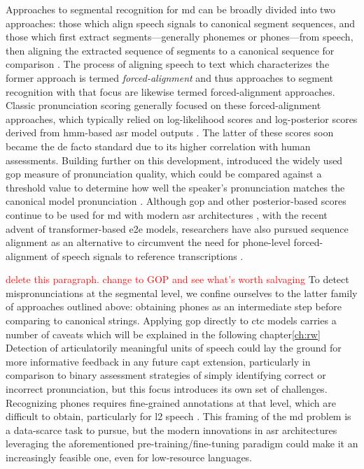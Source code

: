 \documentclass[thesis]{cluu}
\newcommand{\todo}[1]{\textcolor{red}{#1}}
\begin{document}
Approaches to segmental recognition for \gls{md} can be broadly divided into two approaches: those which align speech signals to canonical segment sequences, and those which first extract segments---generally phonemes or phones---from speech, then aligning the extracted sequence of segments to a canonical sequence for comparison \parencite{korzekwaComputerassistedPronunciationTraining2022}. The process of aligning speech to text which characterizes the former approach is termed \textit{forced-alignment} and thus approaches to segment recognition with that focus are likewise termed forced-alignment approaches. Classic pronunciation scoring generally focused on these forced-alignment approaches, which typically relied on log-likelihood scores and log-posterior scores derived from \gls{hmm}-based \gls{asr} model outputs \parencite{wittAutomaticErrorDetection}. The latter of these scores soon became the de facto standard due to its higher correlation with human assessments. Building further on this development, \textcite{witt2000use} introduced the widely used \gls{gop} measure of pronunciation quality, which could be compared against a threshold value to determine how well the speaker's pronunciation matches the canonical model pronunciation \parencite{witt2014computer}. Although \gls{gop} and other posterior-based scores continue to be used for \gls{md} with modern \gls{asr} architectures \parencite[inter alia]{parikhEvaluatingLogitBasedGOP2025,gongTransformerBasedMultiAspectMultiGranularity2022}, with the recent advent of transformer-based \gls{e2e} models, researchers have also pursued sequence alignment as an alternative to circumvent the need for phone-level forced-alignment of speech signals to reference transcriptions \parencite{loEffectiveEndtoEndModeling2020,leungCNNRNNCTCBasedEndtoend2019}. 

\todo{delete this paragraph. change to GOP and see what's worth salvaging}
To detect mispronunciations at the segmental level, we confine ourselves to the latter family of approaches outlined above: obtaining phones as an intermediate step before comparing to canonical strings. Applying \gls{gop} directly to \gls{ctc} models carries a number of caveats which will be explained in the following chapter\ref{ch:rw} Detection of articulatorily meaningful units of speech could lay the ground for more informative feedback in any future \gls{capt} extension, particularly in comparison to binary assessment strategies of simply identifying correct or incorrect pronunciation, but this focus introduces its own set of challenges. Recognizing phones requires fine-grained annotations at that level, which are difficult to obtain, particularly for \gls{l2} speech \parencite{zhangL2GENNeuralPhoneme2022}. This framing of the \gls{md} problem is a data-scarce task to pursue, but the modern innovations in \gls{asr} architectures leveraging the aforementioned pre-training/fine-tuning paradigm could make it an increasingly feasible one, even for low-resource languages.
\end{document}
